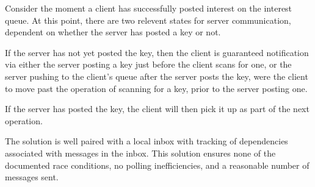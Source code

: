 Consider the moment a client has successfully posted interest on the interest queue.
At this point, there are two relevent states for server communication,
dependent on whether the server has posted a key or not.

If the server has not yet posted the key, then the client is guaranteed
notification via either the server posting a key just before the client scans
for one, or the server pushing to the client's queue after the server posts the
key, were the client to move past the operation of scanning for a key, prior to
the server posting one.

If the server has posted the key, the client will then pick it up as part of
the next operation.

The solution is well paired with a local inbox with tracking of dependencies
associated with messages in the inbox.
This solution ensures none of the documented race conditions, no polling
inefficiencies, and a reasonable number of messages sent.
